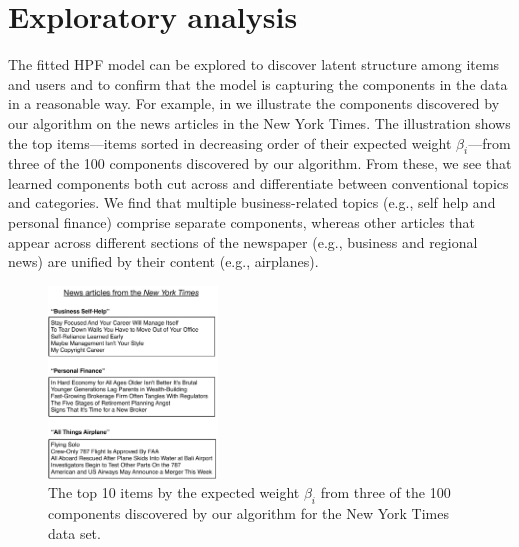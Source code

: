 \section{Exploratory analysis} 
The fitted HPF model can be explored to discover latent structure
among items and users and to confirm that the model is capturing the
components in the data in a reasonable way. For example, in
 we illustrate the components discovered by our
algorithm on the news articles in the New York Times. The illustration
shows the top items---items sorted in decreasing order of their
expected weight $\beta_i$---from three of the 100 components
discovered by our algorithm. From these, we see that learned
components both cut across and differentiate between conventional
topics and categories. We find that multiple business-related topics
(e.g., self help and personal finance) comprise separate components,
whereas other articles that appear across different sections of the
newspaper (e.g., business and regional news) are unified by their
content (e.g., airplanes).


\begin{figure}
\centering
\includegraphics[width=0.4\textwidth]{./figures/attributes-nyt.pdf}
\caption{The top 10 items by the expected weight $\beta_i$ from three
  of the 100 components discovered by our algorithm for the New York
  Times data set.}
\label{fig:components}
\end{figure}


